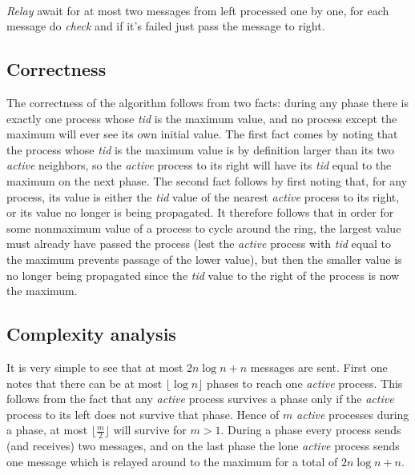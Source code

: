 \documentclass{article}
\begin{document}
\paragraph{}
\textit{Relay} await for at most two messages from left processed one by one, for each message do \textit{check} and if it's failed just pass the message to right.

\subsection*{Correctness}
The correctness of the algorithm follows from two facts: during any phase there is exactly one process whose \textit{tid} is the maximum value, and no process except the maximum will ever see its own initial value. The first fact comes by noting that the process whose \textit{tid} is the maximum value is by definition larger than its two \textit{active} neighbors, so the \textit{active} process to its right will have its \textit{tid} equal to the maximum on the next phase. The second fact follows by first noting that, for any process, its value is either the \textit{tid} value of the nearest \textit{active} process to its right, or its value no longer is being propagated. It therefore follows that in order for some nonmaximum value of a process to cycle around the ring, the largest value must already have passed the process (lest the \textit{active} process with \textit{tid} equal to the maximum prevents passage of the lower value), but then the smaller value is no longer being propagated since the \textit{tid} value to the right of the process is now the maximum.
\subsection*{Complexity analysis}
It is very simple to see that at most $2n \log n + n$ messages are sent. First one
notes that there can be at most $\lfloor{}\log n \rfloor{}$ phases to reach one \textit{active} process. This follows from the fact that any \textit{active} process survives a phase only if the \textit{active} process to its left does not survive that phase. Hence of $m$ \textit{active} processes during a phase, at most $\lfloor{} \frac{m}{2} \rfloor{}$ will survive for $m > 1$. During a phase every process sends (and receives) two messages, and on the last phase the lone \textit{active} process sends one message which is relayed around to the maximum for a total of $2n \log n + n$.

 
\end{document}
